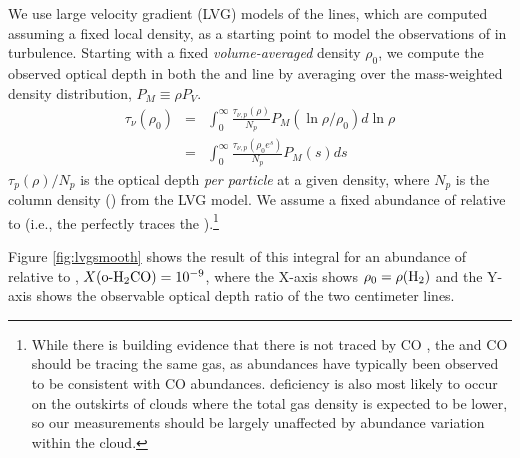We use large velocity gradient (LVG) models of the \formaldehyde lines, which are computed assuming a
fixed local density, as a starting point to model the observations of
\formaldehyde in turbulence.   Starting with a fixed \emph{volume-averaged}
density $\rho_0$, we compute the observed \formaldehyde optical depth in both
the \oneone and \twotwo
line by averaging over the mass-weighted density distribution, $P_M\equiv\rho P_V$.
\begin{eqnarray}
    \label{eqn:tauintegral}
    \tau_{\nu}(\rho_0) &=& \int_{0}^\infty \frac{\tau_{\nu,p}(\rho)}{N_p} P_M(\ln \rho/\rho_0) d \ln \rho\\
                       &=& \int_{0}^\infty \frac{\tau_{\nu,p}(\rho_0 e^s)}{N_p} P_M(s) d s
\end{eqnarray} %
$\tau_p(\rho)/N_p$ is the optical depth \emph{per particle} at a given density, where $N_p$ is the column
density (\perkmspc) from the LVG model.
We assume a fixed abundance of \ortho relative to \hh
(i.e., the \formaldehyde perfectly traces the \hh).\footnote{While there is
building evidence that there is \hh not traced by CO
\citep{Shetty2011b,Shetty2011a}, the \formaldehyde and CO should be tracing the
same gas, as \formaldehyde abundances have typically been observed to be
consistent with CO abundances.  \formaldehyde deficiency is also most likely to
occur on the outskirts of clouds where the total gas density is expected to be
lower, so our measurements should be largely unaffected by abundance variation
within the cloud.}

Figure \ref{fig:lvgsmooth}
shows the result of this integral for an abundance of \ortho relative to \hh, 
$X(\textrm{o-H}_2\textrm{CO})=10^{-9}$, where the X-axis shows $\rho_0 = \rho(\textrm{H}_{2})$ and the Y-axis
shows the observable optical depth ratio of the two \formaldehyde centimeter
lines.

%
%



